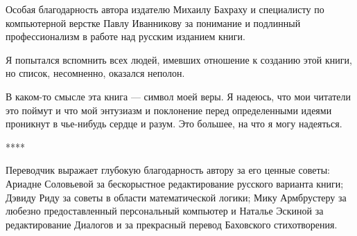 Особая благодарность автора издателю Михаилу Бахраху и специалисту по компьютерной верстке Павлу Иванникову за понимание и подлинный профессионализм в работе над русским изданием книги.

Я попытался вспомнить всех людей, имевших отношение к созданию этой книги, но список, несомненно, оказался неполон.

В каком-то смысле эта книга --- символ моей веры. Я надеюсь, что мои читатели это поймут и что мой энтузиазм и поклонение перед определенными идеями проникнут в чье-нибудь сердце и разум. Это большее, на что я могу надеяться.

****

Переводчик выражает глубокую благодарность автору за его ценные советы: Ариадне Соловьевой за бескорыстное редактирование русского варианта книги; Дэвиду Риду за советы в области математической логики; Мику Армбрустеру за любезно предоставленный персональный компьютер и Наталье Эскиной за редактирование Диалогов и за прекрасный перевод Баховского стихотворения.

